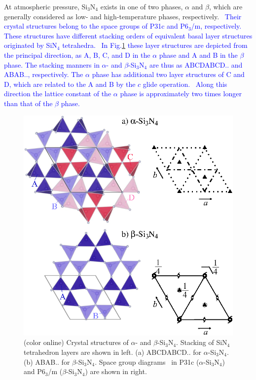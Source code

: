 \documentclass[twocolumn,amsmath,amssymb,a4paper,prb,superscriptaddress,floatfix]{revtex4-1}
\begin{document}
At atmospheric pressure, Si$_3$N$_4$ exists in one of two phases, $\alpha$ and
$\beta$, which are generally considered as low- and high-temperature phases,
respectively.~\cite{zhou,hirosaki,riley} \textcolor {blue}{Their crystal structures belong to the
	space groups of P31c and P6$_3$/m, respectively.~\cite{yashima,boulay} These structures have 
different stacking orders of equivalent basal layer structures originated by SiN$_4$
tetrahedra.~\cite{hampshire} In Fig.\ref{fig:Fig1_cryst}  these layer structures are depicted from
the principal direction, as A, B, C, and D in the $\alpha$ phase and A and B in
the $\beta$ phase. The stacking manners in $\alpha$- and $\beta$-Si$_3$N$_4$ are
thus as ABCDABCD.. and ABAB.., respectively. 
The $\alpha$ phase has additional two layer structures of C and D, which are related to the A and B by
the $c$ glide operation.~\cite{hampshire} Along this direction the lattice constant of the $\alpha$ phase is
approximately two times longer than that of the $\beta$ phase.}
\begin{figure}[ht]
 \begin{center}
  \includegraphics[width=0.90\linewidth]{Fig1_crystal_str2.eps} \caption{(color
  online) Crystal structures of $\alpha$- and $\beta$-Si$_3$N$_4$. Stacking of
  SiN$_4$ tetrahedron layers are shown in left. (a) ABCDABCD.. for
  $\alpha$-Si$_3$N$_4$. (b) ABAB.. for $\beta$-Si$_3$N$_4$.  Space group
  diagrams~\cite{inttableA} in P31c ($\alpha$-Si$_3$N$_4$) and P6$_3$/m ($\beta$-Si$_3$N$_4$)
  are shown in right.}
  \label{fig:Fig1_cryst} 
 \end{center}
\end{figure}
\end{document}
